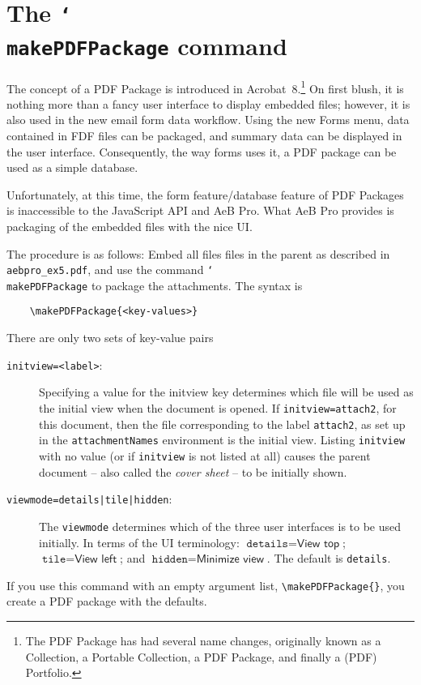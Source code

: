 \documentclass{article}
\newcommand{\cs}[1]{\texttt{\char`\\#1}}
\newcommand\newtopic{\par\ifdim\lastskip>0pt\relax\vskip-\lastskip\fi
\par\vskip6pt\noindent}
\begin{document}
\maketitle

\section*{The \protect\cs{makePDFPackage} command}

The concept of a PDF Package is introduced in Acrobat~8.\footnote{The PDF Package
has had several name changes, originally known as a Collection, a Portable Collection,
a PDF Package, and finally a (PDF) Portfolio.} On first
blush, it is nothing more than a fancy user interface to display
embedded files;  however, it is also used in the new email form data
workflow. Using the new \textsf{Forms} menu, data contained in FDF
files can be packaged, and summary data can be displayed in the user
interface. Consequently, the way forms uses it, a PDF package can be
used as a simple database.

Unfortunately, at this time, the form feature/database feature of
PDF Packages is inaccessible to the JavaScript API and AeB Pro.
What AeB Pro provides is packaging of the embedded files with the
nice UI.

\newtopic The procedure is as follows: Embed all files files in the
parent as described in \texttt{aebpro\_ex5.pdf}, and use the command
\cs{makePDFPackage} to package the attachments. The syntax is
\begin{verbatim}
    \makePDFPackage{<key-values>}
\end{verbatim}
There are only two sets of key-value pairs
\begin{description}
    \item[\texttt{initview=<label>}:] Specifying a value for the
        initview key determines which file will be used as the initial
        view when the document is opened. If
        \texttt{initview=attach2}, for this document, then the file
        corresponding to the label \texttt{attach2}, as set up in the
        \texttt{attachmentNames} environment is the initial view.
        Listing \texttt{initview} with no value (or if
        \texttt{initview} is not listed at all) causes the parent
        document -- also called the \emph{cover sheet} -- to be
        initially shown.

    \item[\texttt{viewmode=details|tile|hidden}:] The
        \texttt{viewmode} determines which of the three user
        interfaces is to be used initially. In terms of the UI
        terminology: $\texttt{details} = \textsf{View top}$;
        $\texttt{tile} = \textsf{View left}$; and $\texttt{hidden} =
        \textsf{Minimize view}$. The default is \texttt{details}.
\end{description}
If you use this command with an empty argument list,
\verb!\makePDFPackage{}!, you create a PDF package with the
defaults.
\end{document}
